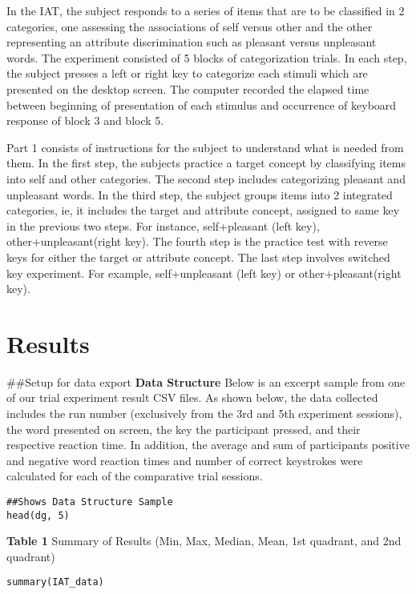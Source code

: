 \documentclass[11pt]{article}
\begin{document}
In the IAT, the subject responds to a series of items that are to be classified in 2 categories, one assessing the associations of self versus other and the other representing an attribute discrimination such as pleasant versus unpleasant words. The experiment consisted of 5 blocks of categorization trials. In each step, the subject presses a left or right key to categorize each stimuli which are presented on the desktop screen. The computer recorded the elapsed time between beginning of presentation of each stimulus and occurrence of keyboard response of block 3 and block 5.

Part 1 consists of instructions for the subject to understand what is needed from them. In the first step, the subjects practice a target concept by classifying items into self and other categories. The second step includes categorizing pleasant and unpleasant words. In the third step, the subject groups items into 2 integrated categories, ie, it includes the target and attribute concept, assigned to same key in the previous two steps. For instance, self+pleasant (left key), other+unpleasant(right key). The fourth step is the practice test with reverse keys for either the target or attribute concept. The last step involves switched key experiment. For example, self+unpleasant (left key) or other+pleasant(right key). 

\section{Results}
\label{sec:org594aaa6}

\#\#Setup for data export
\textbf{Data Structure}
Below is an excerpt sample from one of our trial experiment result CSV files. As shown below, the data collected includes the run number (exclusively from the 3rd and 5th experiment sessions), the word presented on screen, the key the participant pressed, and their respective reaction time. In addition, the average and sum of participants positive and negative word reaction times and number of correct keystrokes were calculated for each of the comparative trial sessions.

\begin{verbatim}
##Shows Data Structure Sample
head(dg, 5)
\end{verbatim}

\textbf{Table 1}
Summary of Results (Min, Max, Median, Mean, 1st quadrant, and 2nd quadrant)
\begin{verbatim}
summary(IAT_data)
\end{verbatim}
\end{document}

